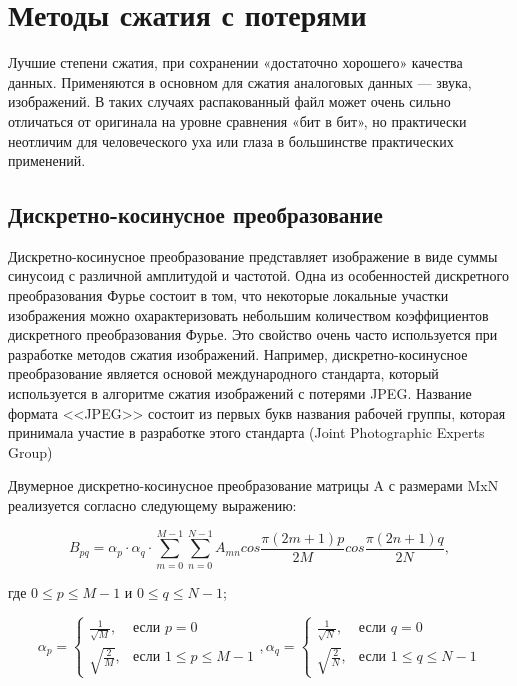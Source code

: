 \section{Методы сжатия с потерями}

Лучшие степени сжатия, при сохранении «достаточно хорошего» качества данных. Применяются в основном для сжатия аналоговых данных — звука, изображений. В таких случаях распакованный файл может очень сильно отличаться от оригинала на уровне сравнения «бит в бит», но практически неотличим для человеческого уха или глаза в большинстве практических применений.

\subsection{Дискретно-косинусное преобразование}

Дискретно-косинусное  преобразование представляет  изображение  в  виде  суммы синусоид  с  различной  амплитудой  и  частотой. Одна  из  особенностей  дискретного преобразования Фурье состоит в том, что некоторые локальные участки изображения можно охарактеризовать  небольшим  количеством  коэффициентов  дискретного  преобразования Фурье. Это свойство очень часто используется при разработке методов сжатия изображений. Например,  дискретно-косинусное  преобразование  является  основой  международного стандарта,  который  используется  в  алгоритме  сжатия  изображений  с  потерями  JPEG. Название  формата  <<JPEG>>  состоит  из  первых  букв  названия  рабочей  группы,  которая принимала участие в разработке этого стандарта (Joint Photographic Experts Group)

Двумерное дискретно-косинусное преобразование матрицы A с размерами MxN реализуется согласно следующему выражению:

\[
B_{pq} = \alpha_p \cdot \alpha_q \cdot \sum_{m=0}^{M-1} \sum_{n=0}^{N-1} A_{mn} cos \frac{\pi(2m+1)p}{2M} cos \frac{\pi(2n+1)q}{2N},
\]

где $0 \leq p \leq M-1$ и $0 \leq q \leq N-1$;

\[
    \alpha_p = 
    \begin{cases}
        \frac{1}{\sqrt{M}}, & \text{если } p =0 \\
        \sqrt{\frac{2}{M}}, & \text{если } 1 \leq p \leq M-1
    \end{cases},
    \alpha_q = 
    \begin{cases}
        \frac{1}{\sqrt{N}}, & \text{если } q =0 \\
        \sqrt{\frac{2}{N}}, & \text{если } 1 \leq q \leq N-1
    \end{cases}
\]

